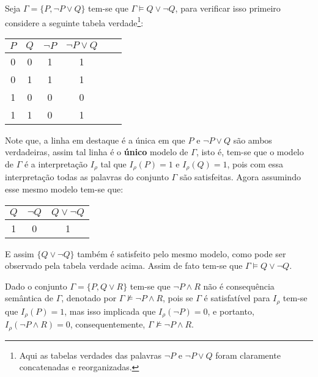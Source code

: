\begin{exemplo}
  Seja $\Gamma = \{P, \neg P \lor Q \}$ tem-se que $\Gamma \vDash Q \lor \neg Q$, para verificar isso primeiro considere a seguinte tabela verdade\footnote{Aqui as tabelas verdades das palavras $\neg P$ e $\neg P \lor Q$ foram claramente concatenadas e reorganizadas.}:

    \begin{table}[H]
        \centering
        \begin{tabular}{|c|c|c|c|c|c|}
             \hline
             $P$ & $Q$ & $\neg P$ & $\neg P \lor Q $ \\ \hline
             0 & 0 & 1 & 1\\ \hline
             0 & 1 & 1 & 1\\  \hline
             1 & 0 & 0 & 0\\  \hline
             \rowcolor{gray}
             1 & 1 & 0 & 1\\  \hline
        \end{tabular}
    \end{table}
    
    Note que, a linha em destaque é a única em que $P$ e $\neg P \lor Q $ são ambos verdadeiras, assim tal linha é o \textbf{único} modelo de $\Gamma$, isto é, tem-se que o modelo de $\Gamma$ é a interpretação $I_\rho$ tal que  $I_\rho(P) = 1$ e $I_\rho(Q) = 1$, pois com essa interpretação todas as palavras do conjunto $\Gamma$ são satisfeitas. Agora assumindo esse mesmo modelo tem-se que: 

    \begin{table}[H]
        \centering
        \begin{tabular}{|c|c|c|}
             \hline
             $Q$ & $\neg Q$ & $Q \lor \neg Q$ \\ \hline
             1 & 0 & 1 \\ \hline
        \end{tabular}
    \end{table}
    
    E assim $\{Q \lor \neg Q\}$ também é satisfeito pelo mesmo modelo, como pode ser observado pela tabela verdade acima. Assim de fato tem-se que $\Gamma \vDash Q \lor \neg Q$.
\end{exemplo}

\begin{exemplo}
  Dado o conjunto $\Gamma = \{P, Q \lor R\}$ tem-se que $\neg P \land R$ não é consequência semântica de $\Gamma$, denotado por $\Gamma \not\vDash \neg P \land R$, pois se $\Gamma$ é satisfatível para $I_\rho$ tem-se que $I_\rho(P) = 1$, mas isso implicada que $I_\rho(\neg P) = 0$, e portanto, $I_\rho(\neg P \land R) = 0$, consequentemente, $\Gamma \not\vDash \neg P \land R$.
\end{exemplo}

